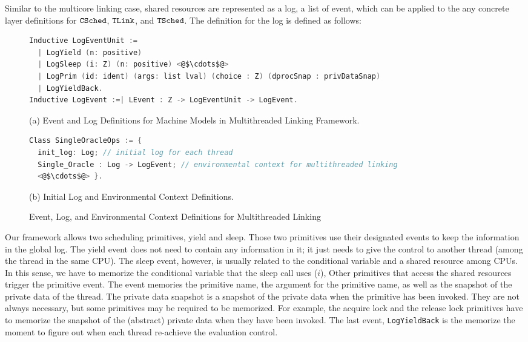 Similar to the multicore linking case, 
shared resources are represented as a log,  a list of event,
which can be applied to the any concrete layer definitions for ${{\mathrm{\texttt{CSched}}}}$, ${{\mathrm{\texttt{TLink}}}}$, and ${{\mathrm{\texttt{TSched}}}}$.
The definition for the log is defined as follows:
\begin{figure}
\begin{lstlisting}[language=C]
Inductive LogEventUnit :=
  | LogYield (n: positive)
  | LogSleep (i: Z) (n: positive) <@$\cdots$@>
  | LogPrim (id: ident) (args: list lval) (choice : Z) (dprocSnap : privDataSnap) 
  | LogYieldBack.
Inductive LogEvent :=| LEvent : Z -> LogEventUnit -> LogEvent.
\end{lstlisting}
\begin{center}
(a) Event and Log Definitions for Machine Models in Multithreaded Linking Framework.
\end{center}
\begin{lstlisting}[language=C, morekeywords={Class}]
Class SingleOracleOps := {
  init_log: Log; // initial log for each thread
  Single_Oracle : Log -> LogEvent; // environmental context for multithreaded linking
  <@$\cdots$@> }.
\end{lstlisting}
\begin{center}
(b) Initial Log and Environmental Context Definitions.
\end{center}
\caption{Event, Log, and Environmental Context Definitions for Multithreaded Linking}
\label{fig:chapter:linking:event-and-log-for-multithreaded-linking}
\end{figure}
Our framework allows two scheduling primitives, 
yield and sleep. 
Those two primitives use their designated events to keep the information in the global log. 
The yield event does not need to contain any information in it; it just needs to give the control
to another thread (among the thread in the same CPU). 
The sleep event, however, is usually related to the conditional variable and a shared resource among CPUs.
In this sense, we have to memorize the conditional variable that the sleep call uses ($i$),
Other primitives that access the shared resources trigger the primitive event. 
The event memories the primitive name, the argument for the primitive name,
as well as the snapshot of the private data of the thread.
The private data snapshot is a snapshot of the private data when the primitive has been invoked. 
They are not always necessary, but some primitives may be required to be memorized.
For example, the acquire lock and the release lock primitives have to memorize the snapshot of the (abstract) private data when they have been invoked. 
The last event, \lstinline$LogYieldBack$ is the memorize the moment to figure out when each thread re-achieve the evaluation control. 

